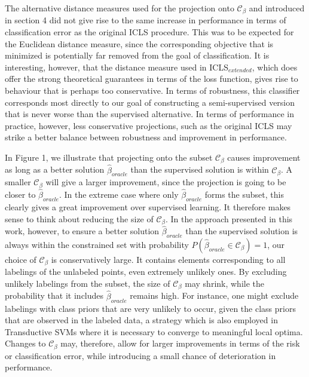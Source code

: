 \documentclass{elsarticle}
\newcommand{\Cb}{\mathcal{C}_{\beta}}
\begin{document}
The alternative distance measures used for the projection onto $\Cb$ and introduced in section 4 did not give rise to the same increase in performance in terms of classification error as the original ICLS procedure. This was to be expected for the Euclidean distance measure, since the corresponding objective that is minimized is potentially far removed from the goal of classification. It is interesting, however, that the distance measure used in ICLS$_{extended}$, which does offer the strong theoretical guarantees in terms of the loss function, gives rise to behaviour that is perhaps too conservative. In terms of robustness, this classifier corresponds most directly to our goal of constructing a semi-supervised version that is never worse than the supervised alternative. In terms of performance in practice, however, less conservative projections, such as the original ICLS may strike a better balance between robustness and improvement in performance.

In Figure 1, we illustrate that projecting onto the subset $\Cb$ causes improvement as long as a better solution $\hat{\beta}_{oracle}$ than the supervised solution is within $\Cb$. A smaller $\Cb$ will give a larger improvement, since the projection is going to be closer to $\hat{\beta}_{oracle}$. In the extreme case where only $\hat{\beta}_{oracle}$ forms the subset, this clearly gives a great improvement over supervised learning. It therefore makes sense to think about reducing the size of $\Cb$. In the approach presented in this work, however, to ensure a better solution $\hat{\beta}_{oracle}$ than the supervised solution is always within the constrained set with probability $P(\hat{\beta}_{oracle} \in \Cb)=1$, our choice of $\Cb$ is conservatively large. It contains elements corresponding to all labelings of the unlabeled points,  even extremely unlikely ones. By excluding unlikely labelings from the subset, the size of $\Cb$ may shrink, while the probability that it includes $\hat{\beta}_{oracle}$ remains high. For instance, one might exclude labelings with class priors that are very unlikely to occur, given the class priors that are observed in the labeled data, a strategy which is also employed in Transductive SVMs where it is necessary to converge to meaningful local optima. Changes to $\Cb$ may, therefore, allow for larger improvements in terms of the risk or classification error, while introducing a small chance of deterioration in performance.
\end{document}
